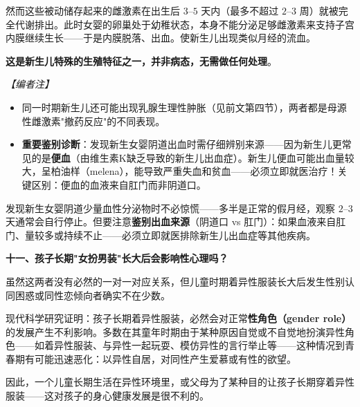 \begin{enumerate}
然而这些被动储存起来的雌激素在出生后 $3$--$5$ 天内（最多不超过 $2$--$3$ 周）就被完全代谢排出。此时女婴的卵巢处于幼稚状态，本身不能分泌足够雌激素来支持子宫内膜继续生长——于是内膜脱落、出血。使新生儿出现类似月经的流血。

\textbf{这是新生儿特殊的生殖特征之一，并非病态，无需做任何处理}。

\vspace{0.3em}
\noindent\textit{【编者注】}
\begin{itemize}
	\item 同一时期新生儿还可能出现乳腺生理性肿胀（见前文第四节），两者都是母源性雌激素"撤药反应"的不同表现。
	\item \textbf{重要鉴别诊断}：发现新生女婴阴道出血时需仔细辨别来源——因为新生儿更常见的是\textbf{便血}（由维生素K缺乏导致的新生儿出血症）。新生儿便血可能出血量较大，呈柏油样（melena），能导致严重失血和贫血——必须立即就医治疗！关键区别：便血的血液来自肛门而非阴道口。
\end{itemize}

\begin{tcolorbox}[colback=pink!5!white,colframe=red!50!black,title=贴心小叮咛]
发现新生女婴阴道少量血性分泌物时不必惊慌——多半是正常的假月经，观察 $2$--$3$ 天通常会自行停止。但要注意\textbf{鉴别出血来源}（阴道口 vs 肛门）：如果血液来自肛门、量较多或持续不止——必须立即就医排除新生儿出血症等其他疾病。
\end{tcolorbox}

\vspace{0.8em}
\noindent\textbf{十一、孩子长期"女扮男装"长大后会影响性心理吗？}

虽然这两者没有必然的一对一对应关系，但儿童时期着异性服装长大后发生性别认同困惑或同性恋倾向者确实不在少数。

现代科学研究证明：孩子长期着异性服装，必然会对正常\textbf{性角色（gender role）}的发展产生不利影响。多数在其童年时期由于某种原因自觉或不自觉地扮演异性角色——如着异性服装、与异性一起玩耍、模仿异性的言行举止等——这种情况到青春期有可能迅速恶化：以异性自居，对同性产生爱慕或有性的欲望。

因此，一个儿童长期生活在异性环境里，或父母为了某种目的让孩子长期穿着异性服装——这对孩子的身心健康发展是很不利的。


\end{enumerate}
